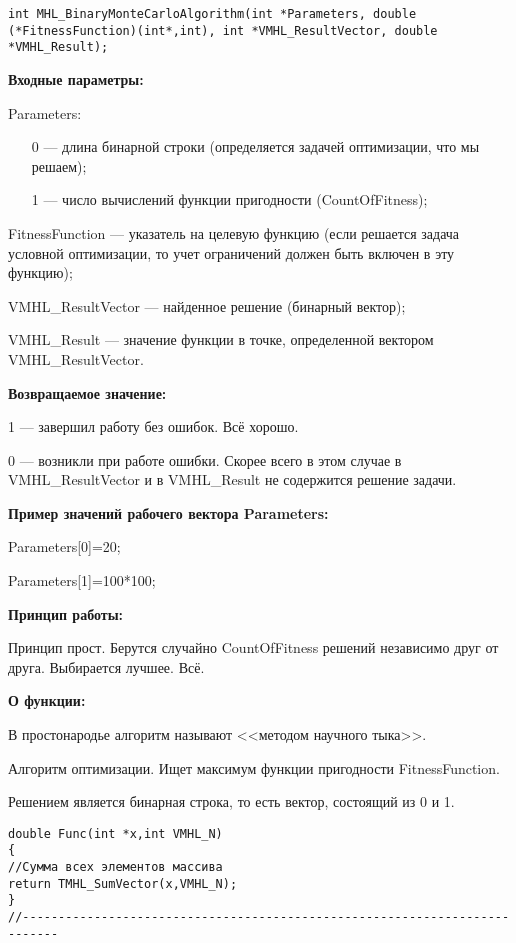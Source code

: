 \documentclass[a4paper,12pt]{article}
\begin{document}
\begin{lstlisting}[label=code_syntax_MHL_BinaryMonteCarloAlgorithm,caption=Синтаксис]
int MHL_BinaryMonteCarloAlgorithm(int *Parameters, double (*FitnessFunction)(int*,int), int *VMHL_ResultVector, double *VMHL_Result);
\end{lstlisting}

\textbf{Входные параметры:}

 Parameters:
 
 \begin{itemize}
 \item [0] --- длина бинарной строки (определяется задачей оптимизации, что мы решаем);
 \item [1] --- число вычислений функции пригодности (CountOfFitness);
 \end{itemize}
  
 FitnessFunction --- указатель на целевую функцию (если решается задача условной оптимизации, то учет ограничений должен быть включен в эту функцию);
 
 VMHL\_ResultVector --- найденное решение (бинарный вектор);
 
 VMHL\_Result --- значение функции в точке, определенной вектором VMHL\_ResultVector.

\textbf{Возвращаемое значение:}
 
 1 --- завершил работу без ошибок. Всё хорошо.
 
 0 --- возникли при работе ошибки. Скорее всего в этом случае в VMHL\_ResultVector и в VMHL\_Result не содержится решение задачи.
 
\textbf{Пример значений рабочего вектора Parameters:}

 Parameters[0]=20;
 
 Parameters[1]=100*100;
 
 \textbf{Принцип работы:}
 
 Принцип прост. Берутся случайно CountOfFitness решений независимо друг от друга. Выбирается лучшее. Всё.
 
 \textbf{ О функции:}
 
 В простонародье алгоритм называют <<методом научного тыка>>.
 
Алгоритм оптимизации. Ищет максимум функции пригодности FitnessFunction.

Решением является бинарная строка, то есть вектор, состоящий из 0 и 1.

\begin{lstlisting}[caption=Оптимизируемая функция]
double Func(int *x,int VMHL_N)
{
//Сумма всех элементов массива
return TMHL_SumVector(x,VMHL_N);
}
//---------------------------------------------------------------------------
\end{lstlisting}
\end{document}
